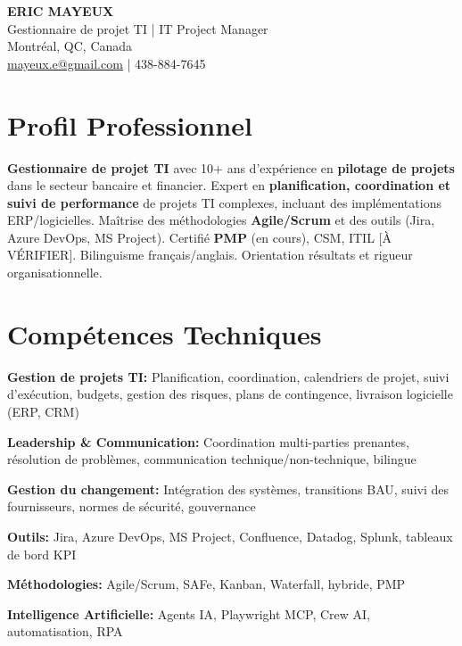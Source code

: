 \documentclass[11pt,a4paper]{article}
\begin{document}
\begin{center}
    {\LARGE \textbf{ERIC MAYEUX}}\\
    \vspace{4pt}
    {\large Gestionnaire de projet TI | IT Project Manager}\\
    \vspace{4pt}
    Montréal, QC, Canada\\
    \href{mailto:mayeux.e@gmail.com}{mayeux.e@gmail.com} | 438-884-7645
\end{center}

\vspace{8pt}

\section*{Profil Professionnel}
\noindent
\textbf{Gestionnaire de projet TI} avec 10+ ans d'expérience en \textbf{pilotage de projets} dans le secteur bancaire et financier. Expert en \textbf{planification, coordination et suivi de performance} de projets TI complexes, incluant des implémentations ERP/logicielles. Maîtrise des méthodologies \textbf{Agile/Scrum} et des outils (Jira, Azure DevOps, MS Project). Certifié \textbf{PMP} (en cours), CSM, ITIL [À VÉRIFIER]. Bilinguisme français/anglais. Orientation résultats et rigueur organisationnelle.

\section*{Compétences Techniques}

\textbf{Gestion de projets TI:} Planification, coordination, calendriers de projet, suivi d'exécution, budgets, gestion des risques, plans de contingence, livraison logicielle (ERP, CRM)

\textbf{Leadership \& Communication:} Coordination multi-parties prenantes, résolution de problèmes, communication technique/non-technique, bilingue

\textbf{Gestion du changement:} Intégration des systèmes, transitions BAU, suivi des fournisseurs, normes de sécurité, gouvernance

\textbf{Outils:} Jira, Azure DevOps, MS Project, Confluence, Datadog, Splunk, tableaux de bord KPI

\textbf{Méthodologies:} Agile/Scrum, SAFe, Kanban, Waterfall, hybride, PMP

\textbf{Intelligence Artificielle:} Agents IA, Playwright MCP, Crew AI, automatisation, RPA
\end{document}
